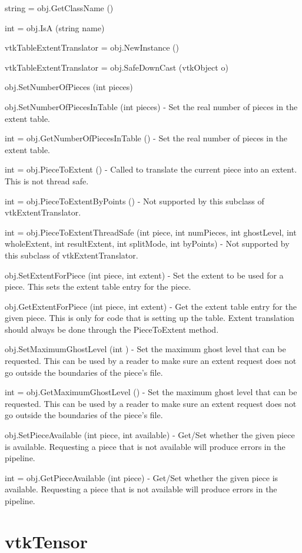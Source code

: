 \begin{DoxyItemize}
\item {\ttfamily string = obj.\-Get\-Class\-Name ()}  
\item {\ttfamily int = obj.\-Is\-A (string name)}  
\item {\ttfamily vtk\-Table\-Extent\-Translator = obj.\-New\-Instance ()}  
\item {\ttfamily vtk\-Table\-Extent\-Translator = obj.\-Safe\-Down\-Cast (vtk\-Object o)}  
\item {\ttfamily obj.\-Set\-Number\-Of\-Pieces (int pieces)}  
\item {\ttfamily obj.\-Set\-Number\-Of\-Pieces\-In\-Table (int pieces)} -\/ Set the real number of pieces in the extent table.  
\item {\ttfamily int = obj.\-Get\-Number\-Of\-Pieces\-In\-Table ()} -\/ Set the real number of pieces in the extent table.  
\item {\ttfamily int = obj.\-Piece\-To\-Extent ()} -\/ Called to translate the current piece into an extent. This is not thread safe.  
\item {\ttfamily int = obj.\-Piece\-To\-Extent\-By\-Points ()} -\/ Not supported by this subclass of vtk\-Extent\-Translator.  
\item {\ttfamily int = obj.\-Piece\-To\-Extent\-Thread\-Safe (int piece, int num\-Pieces, int ghost\-Level, int whole\-Extent, int result\-Extent, int split\-Mode, int by\-Points)} -\/ Not supported by this subclass of vtk\-Extent\-Translator.  
\item {\ttfamily obj.\-Set\-Extent\-For\-Piece (int piece, int extent)} -\/ Set the extent to be used for a piece. This sets the extent table entry for the piece.  
\item {\ttfamily obj.\-Get\-Extent\-For\-Piece (int piece, int extent)} -\/ Get the extent table entry for the given piece. This is only for code that is setting up the table. Extent translation should always be done through the Piece\-To\-Extent method.  
\item {\ttfamily obj.\-Set\-Maximum\-Ghost\-Level (int )} -\/ Set the maximum ghost level that can be requested. This can be used by a reader to make sure an extent request does not go outside the boundaries of the piece's file.  
\item {\ttfamily int = obj.\-Get\-Maximum\-Ghost\-Level ()} -\/ Set the maximum ghost level that can be requested. This can be used by a reader to make sure an extent request does not go outside the boundaries of the piece's file.  
\item {\ttfamily obj.\-Set\-Piece\-Available (int piece, int available)} -\/ Get/\-Set whether the given piece is available. Requesting a piece that is not available will produce errors in the pipeline.  
\item {\ttfamily int = obj.\-Get\-Piece\-Available (int piece)} -\/ Get/\-Set whether the given piece is available. Requesting a piece that is not available will produce errors in the pipeline.  
\end{DoxyItemize}\hypertarget{vtkcommon_vtktensor}{}\section{vtk\-Tensor}\label{vtkcommon_vtktensor}
